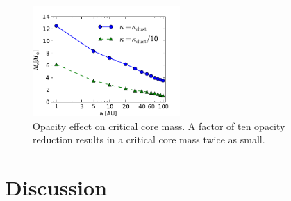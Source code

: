 \documentclass[apj]{emulateapj}
\begin{document}
%
% 
% 
%



\begin{figure}[h]
\centering
\includegraphics[width=0.5\textwidth]{../../figs/ModelAtmospheres/RadSelfGravPoly/PaperFigs/Mcrit_vs_a_3Myrs_opacity.pdf}
\caption{Opacity effect on critical core mass. A factor of ten opacity reduction results in a critical core mass twice as small.}
\label{fig:Mcritopacity}
\end{figure}

\section{Discussion}
\label{discussion}
\end{document}
